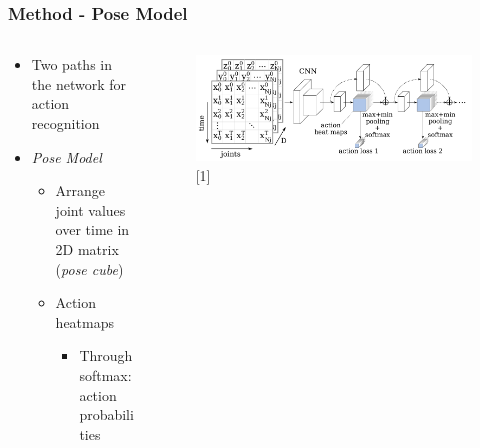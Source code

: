\documentclass[9pt]{beamer}
\providecommand{\sourcefix}[1]{\\ \footnotesize \tugreen{Source:} [#1]}
\newenvironment{myframe}[1][]{%
\begin{frame}%
\frametitle{#1}
\setcounter{footnote}{0}


}{%
\end{frame}%
}
\begin{document}
\begin{myframe}[Method - Pose Model]
	\begin{columns}[T]
        \begin{column}{.45\textwidth}
            \begin{itemize}
                \item Two paths in the network for action recognition
                \item \textit{Pose Model}
                \begin{itemize}
                    \item Arrange joint values over time in 2D matrix (\textit{pose cube})
                    \item Action heatmaps
                    \begin{itemize}
                        \item Through softmax: action probabilities
                    \end{itemize}
                \end{itemize}
            \end{itemize}
        \end{column}
        \begin{column}{.45\textwidth}
            \begin{figure}
                \includegraphics[width=.99\textwidth]{jointsovertime.png}
                \sourcefix{1}
            \end{figure}
        \end{column}
	\end{columns}
\end{myframe}
\end{document}
